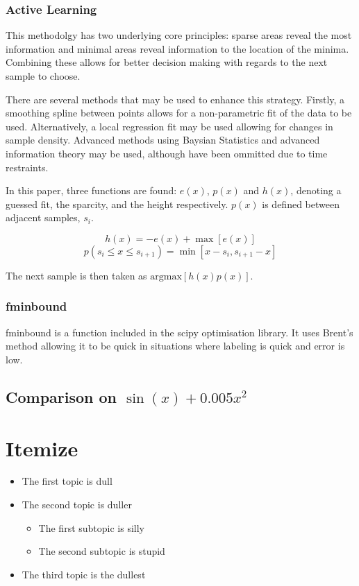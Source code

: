 \subsubsection{Active Learning}
This methodolgy has two underlying core principles: sparse areas reveal the most information and minimal areas reveal information to the location of the minima. Combining these allows for better decision making with regards to the next sample to choose.

There are several methods that may be used to enhance this strategy. Firstly, a smoothing spline between points allows for a non-parametric fit of the data to be used. Alternatively, a local regression fit may be used allowing for changes in sample density. Advanced methods using Baysian Statistics and advanced information theory may be used, although have been ommitted due to time restraints.

In this paper, three functions are found: $e(x)$, $p(x)$ and $h(x)$, denoting a guessed fit, the sparcity, and the height respectively. $p(x)$ is defined between adjacent samples, $s_i$.

\begin{equation}
  {h(x)=-e(x)+\max[e(x)]}
\end{equation}
\begin{equation}
  p(s_i \le x \le s_{i+1})=\min[x-s_i, s_{i+1}-x]
\end{equation}

The next sample is then taken as $\text{argmax}[h(x)p(x)]$.

\subsubsection{fminbound}
fminbound is a function included in the scipy optimisation library. It uses Brent's method allowing it to be quick in situations where labeling is quick and error is low.
\subsection[Comparison One]{Comparison on $\sin(x)+0.005x^2$}




\section*{Itemize}
\begin{itemize}
\item The first topic is dull
\item The second topic is duller
\begin{itemize}
\item The first subtopic is silly
\item The second subtopic is stupid
\end{itemize}
\item The third topic is the dullest
\end{itemize}

